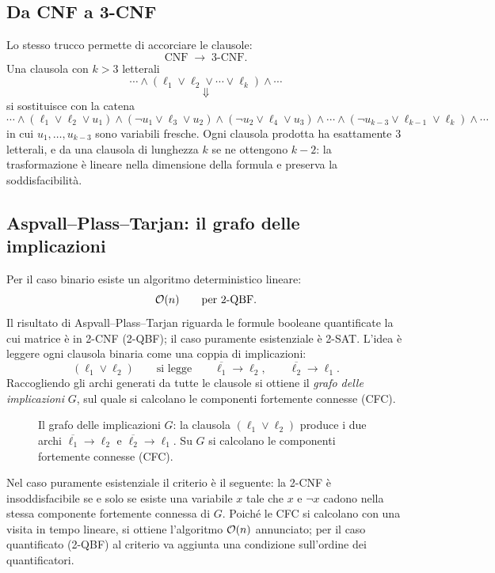 \subsection{Da CNF a 3-CNF}

Lo stesso trucco permette di accorciare le clausole:
\[
  \text{CNF}\;\longrightarrow\;\text{3-CNF}.
\]
Una clausola con $k>3$ letterali
\[
  \cdots\wedge(\ell_1\vee\ell_2\vee\cdots\vee\ell_k)\wedge\cdots
\]
\[\Downarrow\]
si sostituisce con la catena
\[
  \cdots\wedge(\ell_1\vee\ell_2\vee u_1)\wedge(\neg u_1\vee\ell_3\vee u_2)\wedge(\neg u_2\vee\ell_4\vee u_3)
  \wedge\cdots\wedge(\neg u_{k-3}\vee\ell_{k-1}\vee\ell_k)\wedge\cdots
\]
in cui $u_1,\dots,u_{k-3}$ sono variabili fresche. Ogni clausola prodotta ha esattamente $3$
letterali, e da una clausola di lunghezza $k$ se ne ottengono $k-2$: la trasformazione è
lineare nella dimensione della formula e preserva la soddisfacibilità.

\subsection{Aspvall--Plass--Tarjan: il grafo delle implicazioni}

Per il caso binario esiste un algoritmo deterministico lineare:
\[
  \mathcal{O}(n)\qquad\text{per 2-QBF.}
\]
Il risultato di Aspvall--Plass--Tarjan riguarda le formule booleane quantificate la cui
matrice è in 2-CNF (2-QBF); il caso puramente esistenziale è 2-SAT. L'idea è leggere ogni
clausola binaria come una coppia di implicazioni:
\[
  (\ell_1\vee\ell_2)
  \qquad\text{si legge}\qquad
  \overline{\ell_1}\to\ell_2,\qquad \overline{\ell_2}\to\ell_1 .
\]
Raccogliendo gli archi generati da tutte le clausole si ottiene il \emph{grafo delle
implicazioni} $G$, sul quale si calcolano le componenti fortemente connesse (CFC).

\begin{figure}[H]
\centering

\caption{Il grafo delle implicazioni $G$: la clausola $(\ell_1\vee\ell_2)$ produce i due archi
$\overline{\ell_1}\to\ell_2$ e $\overline{\ell_2}\to\ell_1$. Su $G$ si calcolano le componenti
fortemente connesse (CFC).}
\end{figure}

\begin{osservazione}
Nel caso puramente esistenziale il criterio è il seguente: la 2-CNF è insoddisfacibile se e
solo se esiste una variabile $x$ tale che $x$ e $\neg x$ cadono nella stessa componente
fortemente connessa di $G$. Poiché le CFC si calcolano con una visita in tempo lineare, si
ottiene l'algoritmo $\mathcal{O}(n)$ annunciato; per il caso quantificato (2-QBF) al criterio va
aggiunta una condizione sull'ordine dei quantificatori.
\end{osservazione}

